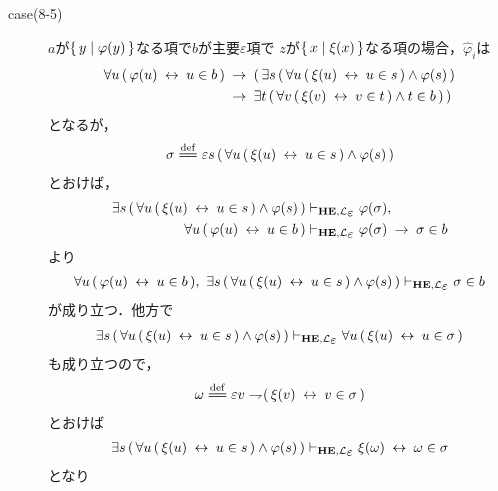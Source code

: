 \begin{metaprf}
\begin{description}
\begin{description}
					\item[case(8-5)] $a$が$\{\, y \mid \varphi(y)\, \}$なる項で$b$が主要$\varepsilon$項で
						$z$が$\{\, x \mid \xi(x)\, \}$なる項の場合，$\widehat{\varphi}_{i}$は
						\begin{align}
							\forall u\, (\, \varphi(u) \hspace{0.25em}\leftrightarrow\hspace{0.25em} u \in b\, ) 
							&\hspace{0.25em}\rightarrow\hspace{0.25em} (\, \exists s\, (\, \forall u\, (\, \xi(u) \hspace{0.25em}\leftrightarrow\hspace{0.25em} u \in s\, ) \wedge \varphi(s)\, ) \\
							&\hspace{0.25em}\rightarrow\hspace{0.25em} \exists t\, (\, \forall v\, (\, \xi(v) \hspace{0.25em}\leftrightarrow\hspace{0.25em} v \in t\, ) \wedge t \in b\, )\, )
						\end{align}
						となるが，
						\begin{align}
							\sigma \defeq \varepsilon s\, (\, \forall u\, (\, \xi(u) \lrarrow u \in s\, ) \wedge \varphi(s)\, )
						\end{align}
						とおけば，
						\begin{align}
							\exists s\, (\, \forall u\, (\, \xi(u) \lrarrow u \in s\, ) \wedge \varphi(s)\, ) 
							&\provable{\mbox{{\bf HE}},\lang{\varepsilon}} \varphi(\sigma), \\
							\forall u\, (\, \varphi(u) \lrarrow u \in b\, )
							&\provable{\mbox{{\bf HE}},\lang{\varepsilon}} \varphi(\sigma) \rarrow \sigma \in b
						\end{align}
						より
						\begin{align}
							\forall u\, (\, \varphi(u) \lrarrow u \in b\, ),\ 
							\exists s\, (\, \forall u\, (\, \xi(u) \lrarrow u \in s\, ) \wedge \varphi(s)\, ) 
							\provable{\mbox{{\bf HE}},\lang{\varepsilon}} \sigma \in b
						\end{align}
						が成り立つ．他方で
						\begin{align}
							\exists s\, (\, \forall u\, (\, \xi(u) \lrarrow u \in s\, ) \wedge \varphi(s)\, ) 
							\provable{\mbox{{\bf HE}},\lang{\varepsilon}} \forall u\, (\, \xi(u) \lrarrow u \in \sigma\, )
						\end{align}
						も成り立つので，
						\begin{align}
							\omega \defeq \varepsilon v \negation (\, \xi(v) \lrarrow v \in \sigma\, )
						\end{align}
						とおけば
						\begin{align}
							\exists s\, (\, \forall u\, (\, \xi(u) \lrarrow u \in s\, ) \wedge \varphi(s)\, ) 
							\provable{\mbox{{\bf HE}},\lang{\varepsilon}} \xi(\omega) \lrarrow \omega \in \sigma
						\end{align}
						となり
						\begin{align}

\end{align}
\end{description}
\end{description}
\end{metaprf}
